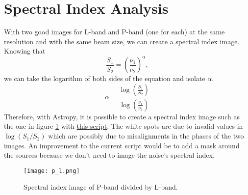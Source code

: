 \documentclass[11pt,letterpaper]{article}
\begin{document}
\section{Spectral Index Analysis}
With two good images for L-band and P-band (one for each) at the same resolution and with the same beam size, we can create a spectral index image. Knowing that
\begin{equation}
    \frac{S_1}{S_2} = \left(\frac{\nu_1}{\nu_2}\right)^{\alpha},
\end{equation}
we can take the logarithm of both sides of the equation and isolate $\alpha$.
\begin{equation}
    \alpha = \frac{\log \left(\frac{S_1}{S_2}\right)}{\log \left(\frac{\nu_1}{\nu_2}\right)}
\end{equation}
Therefore, with Astropy, it is possible to create a spectral index image such as the one in figure \ref{fig:p/l} with \href{https://github.com/eliocentrisme/coma_data_reduction/blob/main/spectral_image.py}{this script}. The white spots are due to invalid values in $\log(S_1/S_2)$ which are possibly due to misalignments in the phases of the two images. An improvement to the current script would be to add a mask around the sources because we don't need to image the noise's spectral index.

\begin{figure}
    \centering
    \texttt{[image: p\_l.png]}
    \caption{Spectral index image of P-band divided by L-band.}
    \label{fig:p/l}
\end{figure}

\newpage

\end{document}
